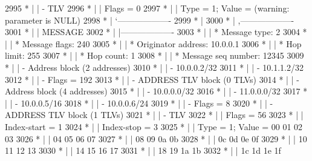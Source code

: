 \begin{DoxyCode}
2995 \textcolor{comment}{         * |    |     - TLV}
2996 \textcolor{comment}{         * |    |         Flags = 0}
2997 \textcolor{comment}{         * |    |         Type = 1; Value = (warning: parameter is NULL)}
2998 \textcolor{comment}{         * |    `-------------------}
2999 \textcolor{comment}{         * |}
3000 \textcolor{comment}{         * |    ,-------------------}
3001 \textcolor{comment}{         * |    |  MESSAGE}
3002 \textcolor{comment}{         * |    |-------------------}
3003 \textcolor{comment}{         * |    | * Message type:       2}
3004 \textcolor{comment}{         * |    | * Message flags:  240}
3005 \textcolor{comment}{         * |    | * Originator address: 10.0.0.1}
3006 \textcolor{comment}{         * |    | * Hop limit:          255}
3007 \textcolor{comment}{         * |    | * Hop count:          1}
3008 \textcolor{comment}{         * |    | * Message seq number: 12345}
3009 \textcolor{comment}{         * |    | - Address block (2 addresses)}
3010 \textcolor{comment}{         * |    |     - 10.0.0.2/32}
3011 \textcolor{comment}{         * |    |     - 10.1.1.2/32}
3012 \textcolor{comment}{         * |    |     - Flags = 192}
3013 \textcolor{comment}{         * |    | - ADDRESS TLV block (0 TLVs)}
3014 \textcolor{comment}{         * |    | - Address block (4 addresses)}
3015 \textcolor{comment}{         * |    |     - 10.0.0.0/32}
3016 \textcolor{comment}{         * |    |     - 11.0.0.0/32}
3017 \textcolor{comment}{         * |    |     - 10.0.0.5/16}
3018 \textcolor{comment}{         * |    |     - 10.0.0.6/24}
3019 \textcolor{comment}{         * |    |     - Flags = 8}
3020 \textcolor{comment}{         * |    | - ADDRESS TLV block (1 TLVs)}
3021 \textcolor{comment}{         * |    |     - TLV}
3022 \textcolor{comment}{         * |    |         Flags = 56}
3023 \textcolor{comment}{         * |    |         Index-start = 1}
3024 \textcolor{comment}{         * |    |         Index-stop = 3}
3025 \textcolor{comment}{         * |    |         Type = 1; Value = 00  01  02  03}
3026 \textcolor{comment}{         * |    |                           04  05  06  07}
3027 \textcolor{comment}{         * |    |                           08  09  0a  0b}
3028 \textcolor{comment}{         * |    |                           0c  0d  0e  0f}
3029 \textcolor{comment}{         * |    |                           10  11  12  13}
3030 \textcolor{comment}{         * |    |                           14  15  16  17}
3031 \textcolor{comment}{         * |    |                           18  19  1a  1b}
3032 \textcolor{comment}{         * |    |                           1c  1d  1e  1f}

\end{DoxyCode}
